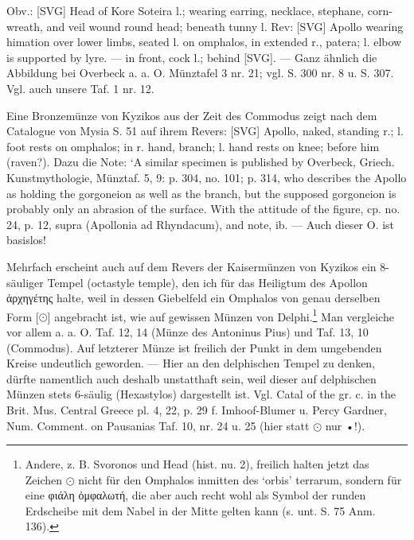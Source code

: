 \documentclass[a4paper, 11pt, oneside]{article}
\begin{document}
Obv.: [SVG] Head of Kore Soteira l.; wearing earring, necklace, stephane, corn-wreath, and veil wound round head; beneath tunny l. Rev: [SVG] Apollo wearing himation over lower limbs, seated l. on omphalos, in extended r., patera; l. elbow is supported by lyre. --- in front, cock l.; behind [SVG]. --- Ganz ähnlich die Abbildung bei Overbeck a. a. O. Münztafel 3 nr. 21; vgl. S. 300 nr. 8 u. S. 307. Vgl. auch unsere Taf. 1 nr. 12.

Eine Bronzemünze von Kyzikos aus der Zeit des Commodus zeigt nach dem Catalogue von Mysia S. 51 auf ihrem Revers: [SVG] Apollo, naked, standing r.; l. foot rests on omphalos; in r. hand, branch; l. hand rests on knee; before him (raven?). Dazu die Note: `A similar specimen is published by Overbeck, Griech. Kunstmythologie, Münztaf. 5, 9: p. 304, no. 101; p. 314, who describes the Apollo as holding the gorgoneion as well as the branch, but the supposed gorgoneion is probably only an abrasion of the surface. With the attitude of the figure, cp. no. 24, p. 12, supra (Apollonia ad Rhyndacum), and note, ib. --- Auch dieser O. ist basislos!

Mehrfach erscheint auch auf dem Revers der Kaisermünzen von Kyzikos ein 8-säuliger Tempel (octastyle temple), den ich für das Heiligtum des Apollon ἀρχηγέτης halte, weil in dessen Giebelfeld ein Omphalos von genau derselben Form [$\odot$] angebracht ist, wie auf gewissen Münzen von Delphi.\footnote{Andere, z. B. Svoronos und Head (hist. nu. 2), freilich halten jetzt das Zeichen $\odot$ nicht für den Omphalos inmitten des `orbis' terrarum, sondern für eine φιάλη ὀμφαλωτή, die aber auch recht wohl als Symbol der runden Erdscheibe mit dem Nabel in der Mitte gelten kann (s. unt. S. 75 Anm. 136).} Man vergleiche vor allem a. a. O. Taf. 12, 14 (Münze des Antoninus Pius) und Taf. 13, 10 (Commodus). Auf letzterer Münze ist freilich der Punkt in dem umgebenden Kreise undeutlich geworden. --- Hier an den delphischen Tempel zu denken, dürfte namentlich auch deshalb unstatthaft sein, weil dieser auf delphischen Münzen stets 6-säulig (Hexastylos) dargestellt ist. Vgl. Catal of the gr. c. in the Brit. Mus. Central Greece pl. 4, 22, p. 29 f. Imhoof-Blumer u. Percy Gardner, Num. Comment. on Pausanias Taf. 10, nr. 24 u. 25 (hier statt $\odot$ nur •!).
\end{document}
